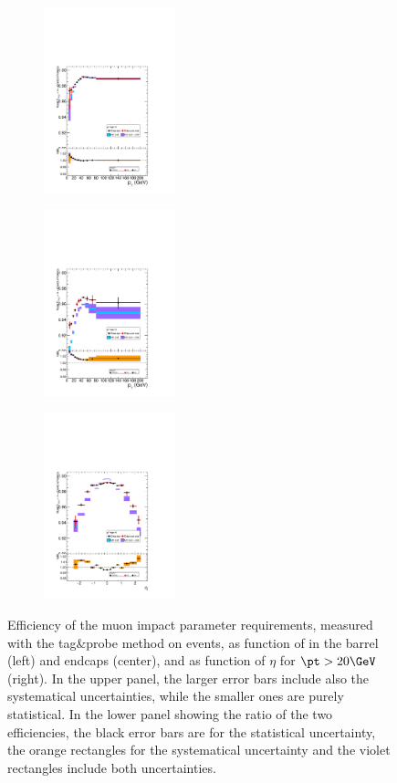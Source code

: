 \begin{figure}[tbh]
\centering
\begin{subfigure}{0.25\textwidth}
\centering
\includegraphics[width=1.5in]{Figures/Muons/mu_SIP4_barrel.pdf}
\caption{}
\end{subfigure}
\begin{subfigure}{0.25\textwidth}
\centering
\includegraphics[width=1.5in]{Figures/Muons/mu_SIP4_endcap.pdf}
\caption{}
\end{subfigure}
\begin{subfigure}{0.25\textwidth}
\centering
\includegraphics[width=1.5in]{Figures/Muons/mu_SIP4_pt20.pdf}
\caption{}
\end{subfigure}
\caption{Efficiency of the muon impact parameter requirements, measured with the tag\&probe method on \Z events, as function of \pt in the barrel (left) and endcaps (center), and as function of $\eta$ for $\pt > 20\GeV$ (right). In the upper panel, the larger error bars include also the systematical uncertainties, while the smaller ones are purely statistical. In the lower panel showing the ratio of the two efficiencies, the black error bars are for the statistical uncertainty, the orange rectangles for the systematical uncertainty and the violet rectangles include both uncertainties.}
\label{fig:MuonIDEff_2}
\end{figure}

